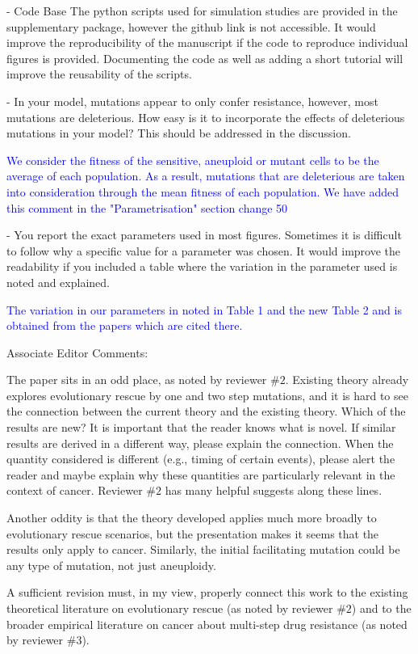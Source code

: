 \documentclass[12pt]{extarticle}
\begin{document}
- Code Base
The python scripts used for simulation studies are provided in the supplementary package, however the github link is not accessible.
It would improve the reproducibility of the manuscript if the code to reproduce individual figures is provided.
Documenting the code as well as adding a short tutorial will improve the reusability of the scripts.

- In your model, mutations appear to only confer resistance, however, most mutations are deleterious. How easy is it to incorporate the effects of deleterious mutations in your model? This should be addressed in the discussion.

\textcolor{blue}{We consider the fitness of the sensitive, aneuploid or mutant cells to be the average of each population. As a result, mutations that are deleterious are taken into consideration through the mean fitness of each population. We have added this comment in the "Parametrisation" section change 50} 

- You report the exact parameters used in most figures. Sometimes it is difficult to follow why a specific value for a parameter was chosen. It would improve the readability if you included a table where the variation in the parameter used is noted and explained.

\textcolor{blue}{The variation in our parameters in noted in Table 1 and the new Table 2 and is obtained from the papers which are cited there.} 

Associate Editor Comments:

The paper sits in an odd place, as noted by reviewer $\#2$. Existing theory already explores evolutionary rescue by one and two step mutations, and it is hard to see the connection between the current theory and the existing theory. Which of the results are new? It is important that the reader knows what is novel. If similar results are derived in a different way, please explain the connection. When the quantity considered is different (e.g., timing of certain events), please alert the reader and maybe explain why these quantities are particularly relevant in the context of cancer. Reviewer $\#2$ has many helpful suggests along these lines.

Another oddity is that the theory developed applies much more broadly to evolutionary rescue scenarios, but the presentation makes it seems that the results only apply to cancer. Similarly, the initial facilitating mutation could be any type of mutation, not just aneuploidy.

A sufficient revision must, in my view, properly connect this work to the existing theoretical literature on evolutionary rescue (as noted by reviewer $\#2$) and to the broader empirical literature on cancer about multi-step drug resistance (as noted by reviewer $\#3$).
\end{document}
